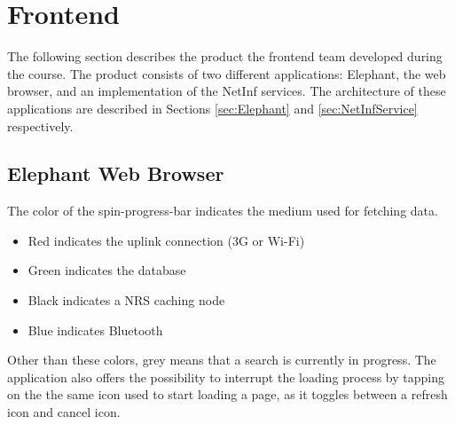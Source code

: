 \section {Frontend}
The following section describes the product the frontend team developed during the course.
The product consists of two different applications: Elephant, the web browser, and an implementation
of the NetInf services. The architecture of these applications are described in Sections \ref{sec:Elephant} and \ref{sec:NetInfService} respectively.

\subsection{Elephant Web Browser}
\label{sec:Elephant Web Browser}
The color of the spin-progress-bar indicates the medium used for fetching data.  
\begin{itemize}
\item Red indicates the uplink connection (3G or Wi-Fi)
\item Green indicates the database
\item Black indicates a NRS caching node
\item Blue indicates Bluetooth
\end{itemize}
Other than these colors, grey means that a search is currently in progress.
The application also offers the possibility to interrupt the
loading process by tapping on the the same icon used to start loading a page, as it toggles between a refresh
icon and cancel icon. 
